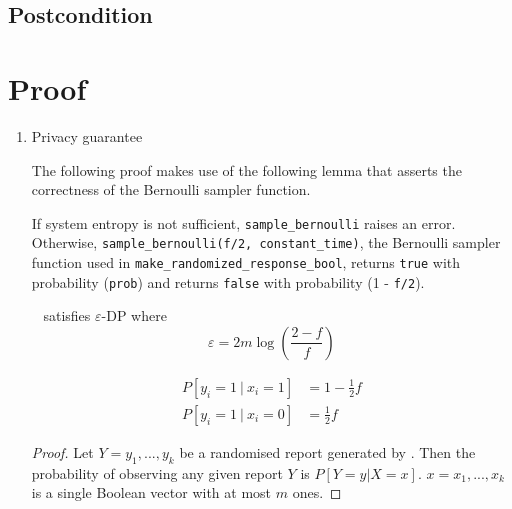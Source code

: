 \documentclass{article}
\begin{document}
\subsection*{Postcondition}


\section{Proof}
\begin{enumerate}
	\item Privacy guarantee
\begin{tcolorbox}
\begin{note}
The following proof makes use of the following lemma that asserts the correctness of the Bernoulli sampler function.
    \begin{lemma}
    If system entropy is not sufficient, \texttt{sample\_bernoulli} raises an error. 
    Otherwise, \texttt{sample\_bernoulli(f/2, constant\_time)}, the Bernoulli sampler function used in \texttt{make\_randomized\_response\_bool}, 
    returns \texttt{true} with probability (\texttt{prob}) and returns  \texttt{false} with probability (1 - \texttt{f/2}).
    \end{lemma}
\end{note}
\end{tcolorbox}
\begin{theorem}~\cite{rappor}
	 satisfies $\varepsilon$-DP where 
	\begin{equation*}
		\varepsilon = 2m\log\left(\frac{2-f}{f}\right)
	\end{equation*}
\end{theorem}
\begin{lemma}
	\begin{align}
		P[y_i = 1~|~x_i=1] &= 1 - \frac{1}{2}f\\
		P[y_i = 1~|~x_i=0] &=\frac{1}{2}f
	\end{align}
\end{lemma}
\begin{proof}
	Let $Y=y_1,...,y_k$ be a randomised report generated by . Then the probability of observing any given report $Y$ is $P[Y=y | X=x]$. $x=x_1,...,x_k$ is a single Boolean vector with at most $m$ ones. 

\end{proof}
\end{enumerate}
\end{document}
